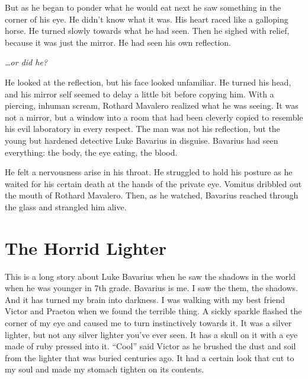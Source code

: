 But as he began to ponder what he would eat next he saw something
in the corner of his eye. He didn't know what it was. His heart
raced like a galloping horse. He turned slowly towards what he had
seen. Then he sighed with relief, because it was just the mirror.
He had seen his own reflection.



{\em {\ldots}or did he?}



He looked at the reflection, but his face looked unfamiliar. He
turned his head, and his mirror self seemed to delay a little bit
before copying him. With a piercing, inhuman scream, Rothard
Mavalero realized what he was seeing. It was not a mirror, but a
window into a room that had been cleverly copied to resemble his
evil laboratory in every respect. The man was not his reflection,
but the young but hardened detective Luke Bavarius in disguise.
Bavarius had seen everything: the body, the eye eating, the
blood.



He felt a nervousness arise in his throat. He struggled to hold his
posture as he waited for his certain death at the hands of the
private eye. Vomitus dribbled out the mouth of Rothard Mavalero.
Then, as he watched, Bavarius reached through the glass and
strangled him alive. 
 



\chapter{The Horrid Lighter}





This is a long story about Luke Bavarius when he saw the shadows in
the world when he was younger in 7th grade. Bavarius is me. I saw
the them, the shadows. And it has turned my brain into darkness. I
was walking with my best friend Victor and Praeton when we found
the terrible thing. A sickly sparkle flashed the corner of my eye
and caused me to turn instinctively towards it. It was a silver
lighter, but not any silver lighter you've ever seen. It has a
skull on it with a eye made of ruby pressed into it. ``Cool'' said
Victor as he brushed the dust and soil from the lighter that was
buried centuries ago. It had a certain look that cut to my soul and
made my stomach tighten on its contents.



